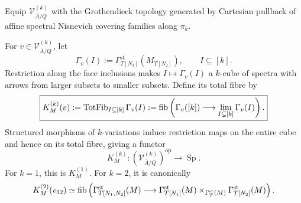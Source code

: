 \begin{definition}
\label{def:var-k-variation-topology}
Equip \(\mathcal V^{(k)}_{\bar A/Q}\) with the Grothendieck topology generated by Cartesian pullback of affine spectral Nisnevich covering families along \(\pi_k\).
\end{definition}

\begin{definition}
\label{def:var-k-difference-functor}
For \(v\in\mathcal V^{(k)}_{\bar A/Q}\), let
\[
    \Gamma_v(I)
    :=
    \Gamma_{T[N_I]}^{\mathrm{st}}(M_{T[N_I]}),
    \qquad I\subseteq[k].
\]
Restriction along the face inclusions makes \(I\mapsto\Gamma_v(I)\) a \(k\)-cube of spectra with arrows from larger subsets to smaller subsets. Define its total fibre by
\[
    \boxed{
    K_M^{(k)}(v)
    :=
    \operatorname{TotFib}_{I\subseteq[k]}\Gamma_v(I)
    :=
    \operatorname{fib}\left(
      \Gamma_v([k])
      \longrightarrow
      \lim_{I\subsetneq[k]}\Gamma_v(I)
    \right).
    }
\]
Structured morphisms of \(k\)-variations induce restriction maps on the entire cube and hence on its total fibre, giving a functor
\[
    K_M^{(k)}:
    (\mathcal V^{(k)}_{\bar A/Q})^{\mathrm{op}}
    \longrightarrow
    \operatorname{Sp}.
\]
For \(k=1\), this is \(K_M^{(1)}\). For \(k=2\), it is canonically
\[
    K_M^{(2)}(v_{12})
    \simeq
    \operatorname{fib}\left(
      \Gamma_{T[N_1,N_2]}^{\mathrm{st}}(M)
      \longrightarrow
      \Gamma_{T[N_1]}^{\mathrm{st}}(M)
      \times_{\Gamma_T^{\mathrm{st}}(M)}
      \Gamma_{T[N_2]}^{\mathrm{st}}(M)
    \right).
\]
\end{definition}

